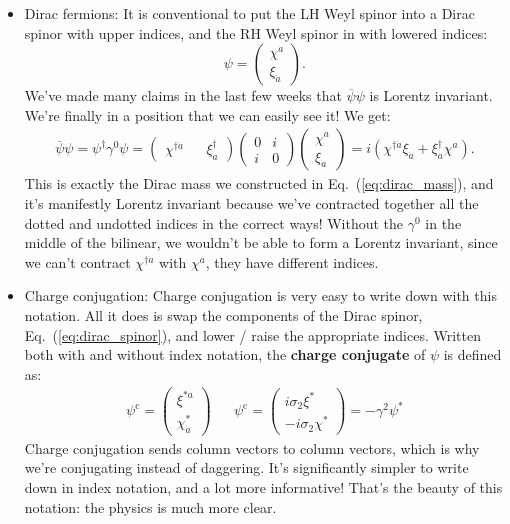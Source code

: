 \documentclass[12pt, oneside]{article}   	%
\theoremstyle{definition}
\begin{document}
\begin{itemize}
	\item Dirac fermions: It is conventional to put the LH Weyl spinor into a Dirac spinor with upper indices, and the RH Weyl spinor in with lowered indices:
	\begin{equation}
		\psi = \begin{pmatrix} \chi^a \\ \xi_{\dot a} \end{pmatrix}. \label{eq:dirac_spinor}
	\end{equation}
	We've made many claims in the last few weeks that $\overline\psi \psi$ is Lorentz invariant. We're finally in a position that we can easily see it! We get:
	\begin{align}
		\overline\psi\psi = \psi^\dagger\gamma^0 \psi = \begin{pmatrix} \chi^{\dagger\dot a} && \xi^\dagger_a \end{pmatrix} \begin{pmatrix} 0 & i \\ i & 0 \end{pmatrix} \begin{pmatrix} \chi^a \\ \xi_{\dot a} \end{pmatrix} = i (\chi^{\dagger \dot a} \xi_{\dot a} + \xi_a^\dagger \chi^a).
	\end{align}
	This is exactly the Dirac mass we constructed in Eq.~(\ref{eq:dirac_mass}), and it's manifestly Lorentz invariant because we've contracted together all the dotted and undotted indices in the correct ways! Without the $\gamma^0$ in the middle of the bilinear, we wouldn't be able to form a Lorentz invariant, since we can't contract $\chi^{\dagger\dot a}$ with $\chi^a$, they have different indices. 
	
	\item Charge conjugation: Charge conjugation is very easy to write down with this notation. All it does is swap the components of the Dirac spinor, Eq.~(\ref{eq:dirac_spinor}), and lower / raise the appropriate indices. Written both with and without index notation, the \textbf{charge conjugate} of $\psi$ is defined as:
	\begin{align}
		\psi^\mathrm{c} = \begin{pmatrix} \xi^{*a} \\ \chi^*_{\dot a} \end{pmatrix} && \psi^\mathrm{c} = \begin{pmatrix} i\sigma_2 \xi^* \\ -i\sigma_2 \chi^* \end{pmatrix}  = -\gamma^2 \psi^*
	\end{align}
	Charge conjugation sends column vectors to column vectors, which is why we're conjugating instead of daggering. It's significantly simpler to write down in index notation, and a lot more informative! That's the beauty of this notation: the physics is much more clear. 
	

\end{itemize}
\end{document}
